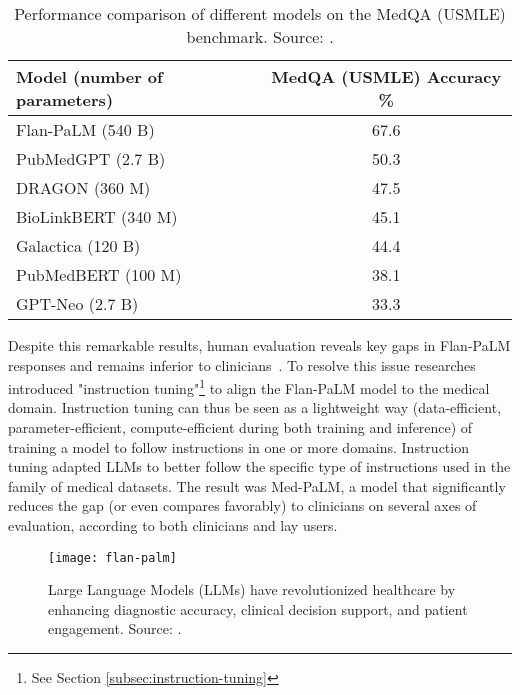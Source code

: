 \begin{table}[!h]
	\centering
	\begin{tabular}{@{}lc@{}}
		\toprule
		Model (number of parameters) & MedQA (USMLE) Accuracy \% \\
		\midrule
		Flan-PaLM (540 B)            & 67.6                      \\
		PubMedGPT (2.7 B)            & 50.3                      \\
		DRAGON (360 M)               & 47.5                      \\
		BioLinkBERT (340 M)          & 45.1                      \\
		Galactica (120 B)            & 44.4                      \\
		PubMedBERT (100 M)           & 38.1                      \\
		GPT-Neo (2.7 B)              & 33.3                      \\
		\bottomrule
	\end{tabular}
	\caption{Performance comparison of different models on the MedQA (USMLE) benchmark. Source: \protect\textcite{singhal2022large}.}
	\label{tab:medqa_performance}
\end{table}

Despite this remarkable results, human evaluation reveals key gaps in Flan-PaLM responses and remains inferior to clinicians~\cite{singhal2022large}.
To resolve this issue researches introduced "instruction tuning"\footnote{See Section \ref{subsec:instruction-tuning}} to align the Flan-PaLM model to the medical domain.
Instruction tuning can thus be seen as a lightweight way (data-efficient, parameter-efficient, compute-efficient during both training and inference) of training a model to follow instructions in one or more domains.
Instruction tuning adapted LLMs to better follow the specific type of instructions used in the family of medical datasets.
The result was Med-PaLM, a model that significantly reduces the gap (or even compares favorably) to clinicians on several axes of evaluation, according to both clinicians and lay users.

\begin{figure}[h!]
	\centering
	\texttt{[image: flan-palm]}
	\caption{Large Language Models (LLMs) have revolutionized healthcare by enhancing diagnostic accuracy, clinical decision support, and patient engagement. Source: \protect\textcite{singhal2022large}.}
	\label{fig:llm-healthcare}
\end{figure}

